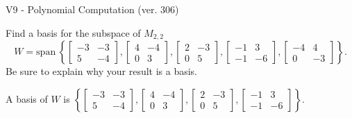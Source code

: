 \begin{exercise}
  \begin{exerciseTitle}V9 - Polynomial Computation (ver. 306)\end{exerciseTitle}
  \begin{exerciseStatement}
    Find a basis for the subspace of \(M_{2,2}\) 
\[W=\mathrm{span}\ \left\{\left[\begin{array}{cc}
-3 & -3 \\
5 & -4
\end{array}\right] , \left[\begin{array}{cc}
4 & -4 \\
0 & 3
\end{array}\right] , \left[\begin{array}{cc}
2 & -3 \\
0 & 5
\end{array}\right] , \left[\begin{array}{cc}
-1 & 3 \\
-1 & -6
\end{array}\right] , \left[\begin{array}{cc}
-4 & 4 \\
0 & -3
\end{array}\right]\right\}.\]
 Be sure to explain why your result is a basis.


  \end{exerciseStatement}
  \begin{exerciseAnswer}
   A basis of \(W\) is  \(\left\{\left[\begin{array}{cc}
-3 & -3 \\
5 & -4
\end{array}\right] , \left[\begin{array}{cc}
4 & -4 \\
0 & 3
\end{array}\right] , \left[\begin{array}{cc}
2 & -3 \\
0 & 5
\end{array}\right] , \left[\begin{array}{cc}
-1 & 3 \\
-1 & -6
\end{array}\right]\right\}\).
  


  \end{exerciseAnswer}
\end{exercise}